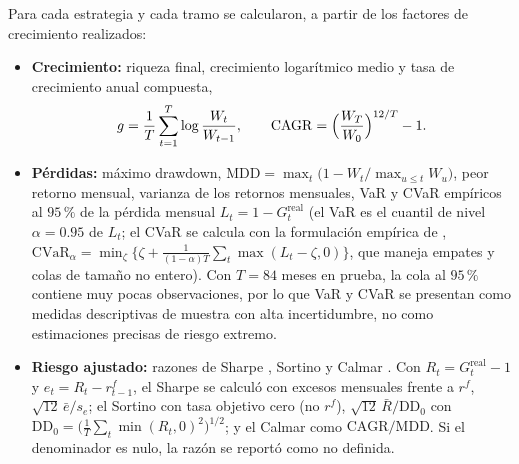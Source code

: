 Para cada estrategia y cada tramo se calcularon, a partir de los factores de crecimiento realizados:
\begin{itemize}
    \item \textbf{Crecimiento:} riqueza final, crecimiento logarítmico medio y tasa de crecimiento anual compuesta,
    \begin{equation}\label{eq:metricas}
    g=\frac1T\sum_{t=1}^{T}\log\frac{W_t}{W_{t-1}},\qquad \mathrm{CAGR}=\Bigl(\frac{W_T}{W_0}\Bigr)^{12/T}-1 .
    \end{equation}
    \item \textbf{Pérdidas:} máximo drawdown, $\mathrm{MDD}=\max_t\bigl(1-W_t/\max_{u\le t}W_u\bigr)$, peor retorno mensual, varianza de los retornos mensuales, 
VaR y CVaR empíricos al $95\,\%$ de la pérdida mensual $L_t=1-G^{\mathrm{real}}_t$ (el VaR es el cuantil de nivel $\alpha=0.95$ de $L_t$; el CVaR se calcula con la formulación empírica de \citet{rockafellaruryasev2000}, $\mathrm{CVaR}_\alpha=\min_{\zeta}\bigl\{\zeta+\tfrac{1}{(1-\alpha)T}\sum_{t}\max(L_t-\zeta,0)\bigr\}$, que maneja empates y colas de tamaño no entero). Con $T=84$ meses en prueba, la cola al $95\,\%$ contiene muy pocas observaciones, por lo que VaR y CVaR se presentan como medidas descriptivas de muestra con alta incertidumbre, no como estimaciones precisas de riesgo extremo.

    \item \textbf{Riesgo ajustado:} 
razones de Sharpe \citep{sharpe1994}, Sortino \citep{sortinoprice1994} y Calmar \citep{young1991}. Con $R_t=G^{\mathrm{real}}_t-1$ y $e_t=R_t-r^f_{t-1}$, el Sharpe se calculó con excesos mensuales frente a $r^f$, $\sqrt{12}\,\bar e/s_e$; el Sortino con tasa objetivo cero (no $r^f$), $\sqrt{12}\,\bar R/\mathrm{DD}_0$ con $\mathrm{DD}_0=\bigl(\tfrac1T\sum_t\min(R_t,0)^2\bigr)^{1/2}$; y el Calmar como $\mathrm{CAGR}/\mathrm{MDD}$. Si el denominador es nulo, la razón se reportó como no definida.


\end{itemize}
